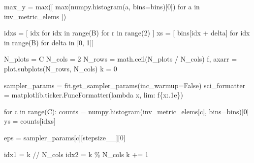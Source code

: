 \documentclass[
  letterpaper,
  DIV=11,
  numbers=noendperiod]{scrartcl}
\newenvironment{Shaded}{\begin{snugshade}}{\end{snugshade}}
\newcommand{\BuiltInTok}[1]{\textcolor[rgb]{0.00,0.23,0.31}{#1}}
\newcommand{\ControlFlowTok}[1]{\textcolor[rgb]{0.00,0.23,0.31}{#1}}
\newcommand{\DecValTok}[1]{\textcolor[rgb]{0.68,0.00,0.00}{#1}}
\newcommand{\KeywordTok}[1]{\textcolor[rgb]{0.00,0.23,0.31}{#1}}
\newcommand{\NormalTok}[1]{\textcolor[rgb]{0.00,0.23,0.31}{#1}}
\newcommand{\OperatorTok}[1]{\textcolor[rgb]{0.37,0.37,0.37}{#1}}
\newcommand{\SpecialCharTok}[1]{\textcolor[rgb]{0.37,0.37,0.37}{#1}}
\newcommand{\SpecialStringTok}[1]{\textcolor[rgb]{0.13,0.47,0.30}{#1}}
\newcommand{\StringTok}[1]{\textcolor[rgb]{0.13,0.47,0.30}{#1}}
\newcommand{\VariableTok}[1]{\textcolor[rgb]{0.07,0.07,0.07}{#1}}
\begin{document}
\begin{Shaded}
\begin{Highlighting}[]
\NormalTok{  max\_y }\OperatorTok{=} \BuiltInTok{max}\NormalTok{([ }\BuiltInTok{max}\NormalTok{(numpy.histogram(a, bins}\OperatorTok{=}\NormalTok{bins)[}\DecValTok{0}\NormalTok{]) }\ControlFlowTok{for}\NormalTok{ a }\KeywordTok{in}\NormalTok{ inv\_metric\_elems ])}
  
\NormalTok{  idxs }\OperatorTok{=}\NormalTok{ [ idx }\ControlFlowTok{for}\NormalTok{ idx }\KeywordTok{in} \BuiltInTok{range}\NormalTok{(B) }\ControlFlowTok{for}\NormalTok{ r }\KeywordTok{in} \BuiltInTok{range}\NormalTok{(}\DecValTok{2}\NormalTok{) ]}
\NormalTok{  xs }\OperatorTok{=}\NormalTok{ [ bins[idx }\OperatorTok{+}\NormalTok{ delta] }\ControlFlowTok{for}\NormalTok{ idx }\KeywordTok{in} \BuiltInTok{range}\NormalTok{(B) }\ControlFlowTok{for}\NormalTok{ delta }\KeywordTok{in}\NormalTok{ [}\DecValTok{0}\NormalTok{, }\DecValTok{1}\NormalTok{]]}

\NormalTok{  N\_plots }\OperatorTok{=}\NormalTok{ C}
\NormalTok{  N\_cols }\OperatorTok{=} \DecValTok{2}
\NormalTok{  N\_rows }\OperatorTok{=}\NormalTok{ math.ceil(N\_plots }\OperatorTok{/}\NormalTok{ N\_cols)}
\NormalTok{  f, axarr }\OperatorTok{=}\NormalTok{ plot.subplots(N\_rows, N\_cols)}
\NormalTok{  k }\OperatorTok{=} \DecValTok{0}
  
\NormalTok{  sampler\_params }\OperatorTok{=}\NormalTok{ fit.get\_sampler\_params(inc\_warmup}\OperatorTok{=}\VariableTok{False}\NormalTok{)}
\NormalTok{  sci\_formatter }\OperatorTok{=}\NormalTok{ matplotlib.ticker.FuncFormatter(}\KeywordTok{lambda}\NormalTok{ x, lim: }\SpecialStringTok{f\textquotesingle{}}\SpecialCharTok{\{}\NormalTok{x}\SpecialCharTok{:.1e\}}\SpecialStringTok{\textquotesingle{}}\NormalTok{)}

  \ControlFlowTok{for}\NormalTok{ c }\KeywordTok{in} \BuiltInTok{range}\NormalTok{(C):}
\NormalTok{    counts }\OperatorTok{=}\NormalTok{ numpy.histogram(inv\_metric\_elems[c], bins}\OperatorTok{=}\NormalTok{bins)[}\DecValTok{0}\NormalTok{]}
\NormalTok{    ys }\OperatorTok{=}\NormalTok{ counts[idxs]}
    
\NormalTok{    eps }\OperatorTok{=}\NormalTok{ sampler\_params[c][}\StringTok{\textquotesingle{}stepsize\_\_\textquotesingle{}}\NormalTok{][}\DecValTok{0}\NormalTok{]}
    
\NormalTok{    idx1 }\OperatorTok{=}\NormalTok{ k }\OperatorTok{//}\NormalTok{ N\_cols}
\NormalTok{    idx2 }\OperatorTok{=}\NormalTok{ k }\OperatorTok{\%}\NormalTok{ N\_cols}
\NormalTok{    k }\OperatorTok{+=} \DecValTok{1}
    

\end{Highlighting}
\end{Shaded}
\end{document}
